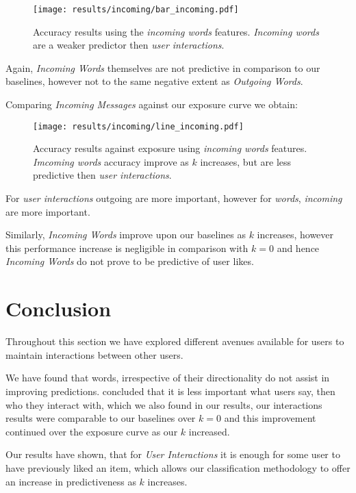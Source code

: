 \begin{figure}[h]
	\begin{center}
		\texttt{[image: results/incoming/bar\_incoming.pdf]}
		\caption{Accuracy results using the \emph{incoming words} features. \emph{Incoming words} are a weaker predictor then \emph{user interactions}.}
	\end{center}
\end{figure}

Again, \emph{Incoming Words} themselves are not predictive in comparison to our baselines, however not to the same negative
extent as \emph{Outgoing Words}.

\clearpage

Comparing \emph{Incoming Messages} against our exposure curve we obtain:

\begin{figure}[h]
	\begin{center}
		\texttt{[image: results/incoming/line\_incoming.pdf]}
		\caption{Accuracy results against exposure using \emph{incoming words} features. \emph{Imcoming words} accuracy improve as $k$ increases, but are less predictive then \emph{user interactions}.
		}
	\end{center}
\end{figure}

For \emph{user interactions} outgoing are more important, however for \emph{words}, \emph{incoming} are more important.

Similarly, \emph{Incoming Words} improve upon our baselines as $k$ increases, however this performance increase is 
negligible in comparison with $k = 0$ and hence \emph{Incoming Words} do not prove to be predictive of user likes.

\section{Conclusion}
\label{sec:conc}

Throughout this section we have explored different avenues available for users to maintain interactions between other users. 

We have found that words, irrespective of their directionality do not assist in improving predictions. \cite{Anderson2012} concluded 
that it is less important what users say, then who they interact with, which we also found in our results, our interactions results were 
comparable to our baselines over $k = 0$ and this improvement continued over the exposure curve as our $k$ increased.

Our results have shown, that for \emph{User Interactions} it is enough for some user to have previously liked an item, which allows our 
classification methodology to offer an increase in predictiveness as $k$ increases.

